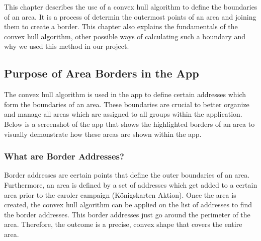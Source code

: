 \Author{\daAuthorThree}

    This chapter describes the use of a convex hull algorithm to define the boundaries of an area. It is a process of determin the outermost points of an area and joining them to create a border. This chapter also explains the fundamentals of the convex hull algorithm, other possible ways of calculating such a boundary and why we used this method in our project.

    \subsection{Purpose of Area Borders in the App}
    The convex hull algorithm is used in the app to define certain addresses which form the boundaries of an area. These boundaries are crucial to better organize and manage all areas which are assigned to all groups within the application. Below is a screenshot of the app that shows the highlighted borders of an area to visually demonstrate how these areas are shown within the app.

    \subsubsection{What are Border Addresses?}
    Border addresses are certain points that define the outer boundaries of an area. Furthermore, an area is defined by a set of addresses which get added to a certain area prior to the caroler campaign (Königskarten Aktion). Once the area is created, the convex hull algorithm can be applied on the list of addresses to find the border addresses. This border addresses just go around the perimeter of the area. Therefore, the outcome is a precise, convex shape that covers the entire area.
    
